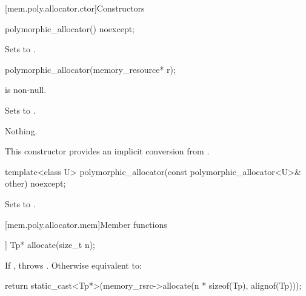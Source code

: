 [mem.poly.allocator.ctor]{Constructors}

%
\begin{itemdecl}
polymorphic_allocator() noexcept;
\end{itemdecl}

\begin{itemdescr}
\pnum
\effects
Sets  to .
\end{itemdescr}

%
\begin{itemdecl}
polymorphic_allocator(memory_resource* r);
\end{itemdecl}

\begin{itemdescr}
\pnum
\expects
{} is non-null.

\pnum
\effects
Sets  to .

\pnum
\throws
Nothing.

\pnum
\begin{note}
This constructor provides an implicit conversion from .
\end{note}
\end{itemdescr}

%
\begin{itemdecl}
template<class U> polymorphic_allocator(const polymorphic_allocator<U>& other) noexcept;
\end{itemdecl}

\begin{itemdescr}
\pnum
\effects
Sets  to .
\end{itemdescr}


[mem.poly.allocator.mem]{Member functions}

%
\begin{itemdecl}
[[nodiscard]] Tp* allocate(size_t n);
\end{itemdecl}

\begin{itemdescr}
\pnum
\effects
If ,
throws .
Otherwise equivalent to:
\begin{codeblock}
return static_cast<Tp*>(memory_rsrc->allocate(n * sizeof(Tp), alignof(Tp)));
\end{codeblock}
\end{itemdescr}

